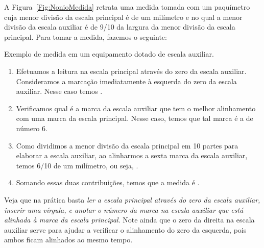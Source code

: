 A Figura~\ref{Fig:NonioMedida} retrata uma medida tomada com um paquímetro cuja menor divisão da escala principal é de um milímetro e no qual a menor divisão da escala auxiliar é de 9/10 da largura da menor divisão da escala principal. Para tomar a medida, fazemos o seguinte:
%
\begin{marginfigure}
\centering
{}
\caption{Exemplo de medida em um equipamento dotado de escala auxiliar.\label{Fig:NonioMedida}}
\end{marginfigure}
%
\begin{enumerate}
	\item Efetuamos a leitura na escala principal através do zero da escala auxiliar. Consideramos a marcação imediatamente à esquerda do zero da escala auxiliar. Nesse caso temos .
	\item Verificamos qual é a marca da escala auxiliar que tem o melhor alinhamento com uma marca da escala principal. Nesse caso, temos que tal marca é a de número 6.
	\item Como dividimos a menor divisão da escala principal em 10 partes para elaborar a escala auxiliar, ao alinharmos a sexta marca da escala auxiliar, temos 6/10 de um milímetro, ou seja, .
	\item Somando essas duas contribuições, temos que a medida é .
\end{enumerate}
%
Veja que na prática basta \emph{ler a escala principal através do zero da escala auxiliar, inserir uma vírgula, e anotar o número da marca na escala auxiliar que está alinhada à marca da escala principal}. Note ainda que o zero da direita na escala auxiliar serve para ajudar a verificar o alinhamento do zero da esquerda, pois ambos ficam alinhados ao mesmo tempo.

